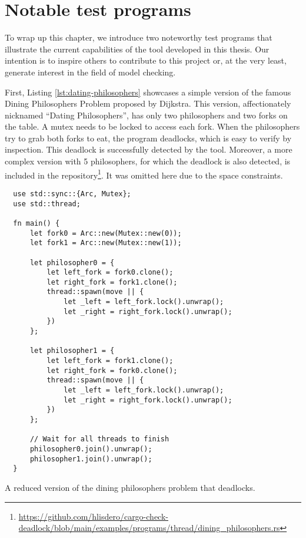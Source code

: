 \section{Notable test programs}

To wrap up this chapter, we introduce two noteworthy test programs that
illustrate the current capabilities of the tool developed in this thesis.
Our intention is to inspire others to contribute to this project or,
at the very least, generate interest in the field of model checking.

First, Listing \ref{lst:dating-philosophers} showcases
a simple version of the famous Dining Philosophers Problem proposed by Dijkstra.
This version, affectionately nicknamed ``Dating Philosophers'',
has only two philosophers and two forks on the table.
A mutex needs to be locked to access each fork.
When the philosophers try to grab both forks to eat, the program deadlocks,
which is easy to verify by inspection.
This deadlock is successfully detected by the tool.
Moreover, a more complex version with 5 philosophers,
for which the deadlock is also detected, is included in the
repository\footnote{\url{https://github.com/hlisdero/cargo-check-deadlock/blob/main/examples/programs/thread/dining\_philosophers.rs}}.
It was omitted here due to the space constraints.

\begin{listing}[!htbp]
    \begin{verbatim}
  use std::sync::{Arc, Mutex};
  use std::thread;
    
  fn main() {
      let fork0 = Arc::new(Mutex::new(0));
      let fork1 = Arc::new(Mutex::new(1));
    
      let philosopher0 = {
          let left_fork = fork0.clone();
          let right_fork = fork1.clone();
          thread::spawn(move || {
              let _left = left_fork.lock().unwrap();
              let _right = right_fork.lock().unwrap();
          })
      };
    
      let philosopher1 = {
          let left_fork = fork1.clone();
          let right_fork = fork0.clone();
          thread::spawn(move || {
              let _left = left_fork.lock().unwrap();
              let _right = right_fork.lock().unwrap();
          })
      };
    
      // Wait for all threads to finish
      philosopher0.join().unwrap();
      philosopher1.join().unwrap();
  }    
  \end{verbatim}
    \caption{A reduced version of the dining philosophers problem that deadlocks.}
    \label{lst:dating-philosophers}
\end{listing}

